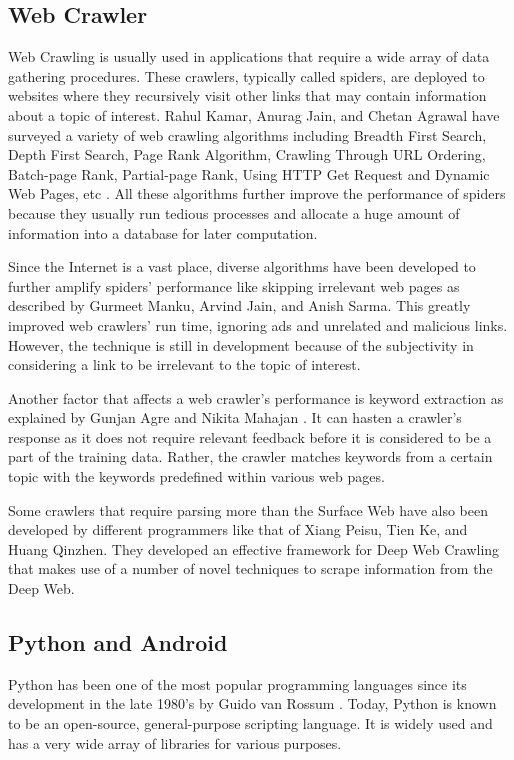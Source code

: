 \documentclass[journal]{./IEEEtran}
\begin{document}
	\subsection{Web Crawler}
	Web Crawling is usually used in applications that require a wide array of data gathering procedures. These crawlers, typically called spiders, are deployed to websites where they recursively visit other links that may contain information about a topic of interest. Rahul Kamar, Anurag Jain, and Chetan Agrawal have surveyed a variety of web crawling algorithms \cite{kumar14} including Breadth First Search, Depth First Search, Page Rank Algorithm, Crawling Through URL Ordering, Batch-page Rank, Partial-page Rank, Using HTTP Get Request and Dynamic Web Pages, etc \cite{olston10}. All these algorithms further improve the performance of spiders because they usually run tedious processes and allocate a huge amount of information into a database for later computation.
	
	Since the Internet is a vast place, diverse algorithms have been developed to further amplify spiders' performance like skipping irrelevant web pages \cite{manku07} as described by Gurmeet Manku, Arvind Jain, and Anish Sarma. This greatly improved web crawlers' run time, ignoring ads and unrelated and malicious links. However, the technique is still in development because of the subjectivity in considering a link to be irrelevant to the topic of interest.
	
	Another factor that affects a web crawler's performance is keyword extraction as explained by Gunjan Agre and Nikita Mahajan \cite{agre15}. It can hasten a crawler's response as it does not require relevant feedback before it is considered to be a part of the training data. Rather, the crawler matches keywords from a certain topic with the keywords predefined within various web pages.
	
	Some crawlers that require parsing more than the Surface
	Web have also been developed by different programmers
	like that of Xiang Peisu, Tien Ke, and Huang Qinzhen. They developed an effective framework for Deep Web Crawling \cite{peisu08} that makes use of a number of novel techniques to scrape information from the Deep Web.
	
	\subsection{Python and Android}
	Python has been one of the most popular programming languages since its development in the late 1980’s by Guido van Rossum \cite{tulchak}. Today, Python is known to be an open-source, general-purpose scripting language. It is widely used and has a very wide array of libraries for various purposes.
	
\end{document}
